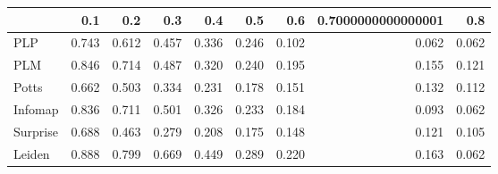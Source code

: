 \begin{tabular}{lrrrrrrrr}
\toprule
{} &   0.1 &   0.2 &   0.3 &   0.4 &   0.5 &   0.6 & 0.7000000000000001 &   0.8 \\
\midrule
PLP      & 0.743 & 0.612 & 0.457 & 0.336 & 0.246 & 0.102 &              0.062 & 0.062 \\
PLM      & 0.846 & 0.714 & 0.487 & 0.320 & 0.240 & 0.195 &              0.155 & 0.121 \\
Potts    & 0.662 & 0.503 & 0.334 & 0.231 & 0.178 & 0.151 &              0.132 & 0.112 \\
Infomap  & 0.836 & 0.711 & 0.501 & 0.326 & 0.233 & 0.184 &              0.093 & 0.062 \\
Surprise & 0.688 & 0.463 & 0.279 & 0.208 & 0.175 & 0.148 &              0.121 & 0.105 \\
Leiden   & 0.888 & 0.799 & 0.669 & 0.449 & 0.289 & 0.220 &              0.163 & 0.062 \\
\bottomrule
\end{tabular}
